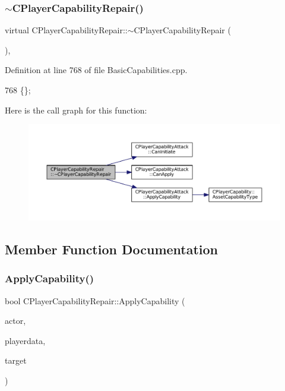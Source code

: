 \subsubsection{\texorpdfstring{$\sim$\+C\+Player\+Capability\+Repair()}{~CPlayerCapabilityRepair()}}
{\footnotesize\ttfamily virtual C\+Player\+Capability\+Repair\+::$\sim$\+C\+Player\+Capability\+Repair (\begin{DoxyParamCaption}{ }\end{DoxyParamCaption})\hspace{0.3cm}{\ttfamily [inline]}, {\ttfamily [virtual]}}



Definition at line 768 of file Basic\+Capabilities.\+cpp.


\begin{DoxyCode}
768 \{\};
\end{DoxyCode}
Here is the call graph for this function\+:
\nopagebreak
\begin{figure}[H]
\begin{center}
\leavevmode
\includegraphics[width=350pt]{classCPlayerCapabilityRepair_ad8ed0fc101b58a3b4eeb42fa3cab0511_cgraph}
\end{center}
\end{figure}


\subsection{Member Function Documentation}
\hypertarget{classCPlayerCapabilityRepair_ab4e8da6f225b4bfb7023d75749454ff1}{}\label{classCPlayerCapabilityRepair_ab4e8da6f225b4bfb7023d75749454ff1} 
\subsubsection{\texorpdfstring{Apply\+Capability()}{ApplyCapability()}}
{\footnotesize\ttfamily bool C\+Player\+Capability\+Repair\+::\+Apply\+Capability (\begin{DoxyParamCaption}\item[{std\+::shared\+\_\+ptr$<$ \hyperlink{classCPlayerAsset}{C\+Player\+Asset} $>$}]{actor,  }\item[{std\+::shared\+\_\+ptr$<$ \hyperlink{classCPlayerData}{C\+Player\+Data} $>$}]{playerdata,  }\item[{std\+::shared\+\_\+ptr$<$ \hyperlink{classCPlayerAsset}{C\+Player\+Asset} $>$}]{target }\end{DoxyParamCaption})\hspace{0.3cm}{\ttfamily [virtual]}}



